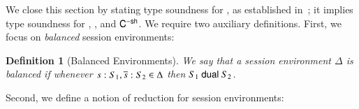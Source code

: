 \documentclass[preprint,11pt]{elsarticle}
\newtheorem{definition}{Definition}[section]
\newtheorem{example}{Example}[section]
\begin{document}
{%


We close this section  by stating  type soundness for \HOp, as established in~\cite{KouzapasPY17}; it implies 
type soundness for \HO, \sessp, and $\mathsf{C}^{-\mathsf{sh}}$. 
We require two auxiliary definitions. First, 
we focus on \emph{balanced} session environments: 


\begin{definition}[Balanced Environments]\label{d:wtenv}%
	We say that a session environment $\Delta$ is {\em balanced} if whenever
	$s: S_1, \overline{s}: S_2 \in \Delta$ then $S_1 \ \mathsf{dual}\  S_2$.
\end{definition}

Second, we define a notion of reduction for session environments:

}
\end{document}
